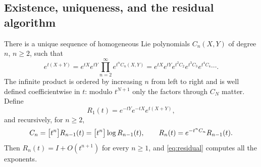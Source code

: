 \subsection{Existence, uniqueness, and the residual algorithm}
\begin{theorem}\label{thm:zassenhaus}
There is a unique sequence of homogeneous Lie polynomials $C_n(X,Y)$ of
degree $n$, $n\geq2$, such that
\begin{equation}\label{eq:zassenhaus}
 \boxed{\displaystyle
 e^{t(X+Y)}=e^{tX}e^{tY}\prod_{n=2}^{\infty}e^{t^nC_n(X,Y)}
 =e^{tX}e^{tY}e^{t^2C_2}e^{t^3C_3}e^{t^4C_4}\cdots.}
\end{equation}
The infinite product is ordered by increasing $n$ from left to right and is
well defined coefficientwise in $t$: modulo $t^{N+1}$ only the factors
through $C_N$ matter. Define
\begin{equation}\label{eq:R1}
 R_1(t)=e^{-tY}e^{-tX}e^{t(X+Y)},
\end{equation}
and recursively, for $n\geq2$,
\begin{equation}\label{eq:residual}
 C_n=\bigl[t^n\bigr]R_{n-1}(t)=\bigl[t^n\bigr]\log R_{n-1}(t),\qquad
 R_n(t)=e^{-t^nC_n}R_{n-1}(t).
\end{equation}
Then $R_n(t)=I+O(t^{n+1})$ for every $n\geq1$, and \eqref{eq:residual}
computes all the exponents.
\end{theorem}
